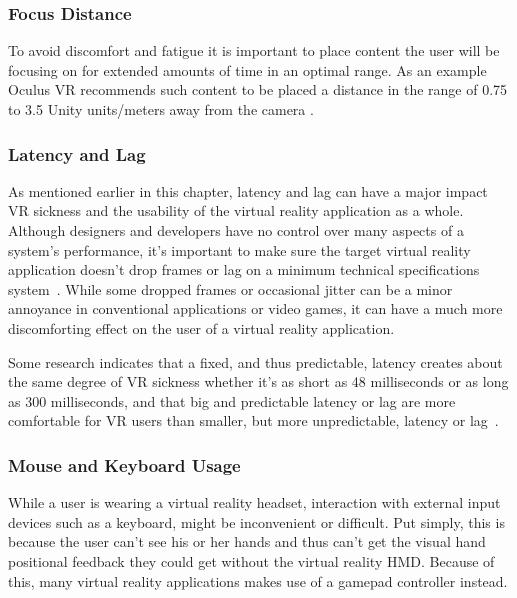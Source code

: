 \subsubsection{Focus Distance}
To avoid discomfort and fatigue it is important to place content the user will be focusing on for extended amounts of time in an optimal range.
As an example Oculus VR recommends such content to be placed a distance in the range of 0.75 to 3.5 Unity units/meters away from the camera \citep{OCULUS2016}. 

\subsubsection{Latency and Lag}
As mentioned earlier in this chapter, latency and lag can have a major impact VR sickness and the usability of the virtual reality application as a whole.
Although designers and developers have no control over many aspects of a system's performance, it's important to make sure the target virtual reality application
doesn't drop frames or lag on a minimum technical specifications system~\citep{OCULUS2016}. While some dropped frames or occasional jitter can be a minor annoyance
in conventional applications or video games, it can have a much more discomforting effect on the user of a virtual reality application. 

Some research indicates that a fixed, and thus predictable, latency creates about the same degree of VR sickness whether it's as short as 48 milliseconds or as long 
as 300 milliseconds, and that big and predictable latency or lag are more comfortable for VR users than smaller, but more unpredictable, latency or lag~\citep{Draper2001}. 

\subsubsection{Mouse and Keyboard Usage}
While a user is wearing a virtual reality headset, interaction with external input devices such as a keyboard, might be inconvenient or difficult. 
Put simply, this is because the user can't see his or her hands and thus can't get the visual hand positional feedback they could get without the virtual reality HMD. 
Because of this, many virtual reality applications makes use of a gamepad controller instead. %






